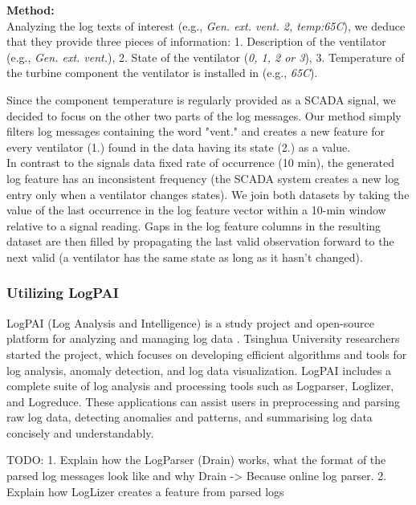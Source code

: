     \begin{flushleft}
      \textbf{Method:}\\
      Analyzing the log texts of interest (e.g., \emph{Gen. ext. vent. 2, temp:65\degree C}), we deduce that they provide three pieces of information: 
      1. Description of the ventilator (e.g., \emph{Gen. ext. vent.}), 2. State of the ventilator (\emph{0, 1, 2 or 3}), 
      3. Temperature of the turbine component the ventilator is installed in (e.g., \emph{65\degree C}).
    \end{flushleft}
    Since the component temperature is regularly provided as a SCADA signal, we decided to focus on the other two parts of the log messages. 
    Our method simply filters log messages containing the word "vent." and creates a new feature for every ventilator (1.) found in the data having its state (2.) as a value.\\
    In contrast to the signals data fixed rate of occurrence (10 min), the generated log feature has an inconsistent frequency (the SCADA system creates a new log entry only 
    when a ventilator changes states). We join both datasets by taking the value of the last occurrence in the log feature vector within a 10-min window relative to a signal reading. 
    Gaps in the log feature columns in the resulting dataset are then filled by propagating the last valid observation forward to the next valid (a ventilator has the same state as long as it hasn't changed).
    
    

  \subsubsection{Utilizing LogPAI}
    LogPAI (Log Analysis and Intelligence) is a study project and open-source platform for analyzing and managing log data \cite{LogPAI}. 
    Tsinghua University researchers started the project, which focuses on developing efficient algorithms and tools for log analysis, anomaly detection, and log data visualization.
    LogPAI includes a complete suite of log analysis and processing tools such as Logparser, Loglizer, and Logreduce. 
    These applications can assist users in preprocessing and parsing raw log data, detecting anomalies and patterns, and summarising log data concisely and understandably.

    TODO:
    1. Explain how the LogParser (Drain) works, what the format of the parsed log messages look like and why Drain -> Because online log parser. 
    2. Explain how LogLizer creates a feature from parsed logs

